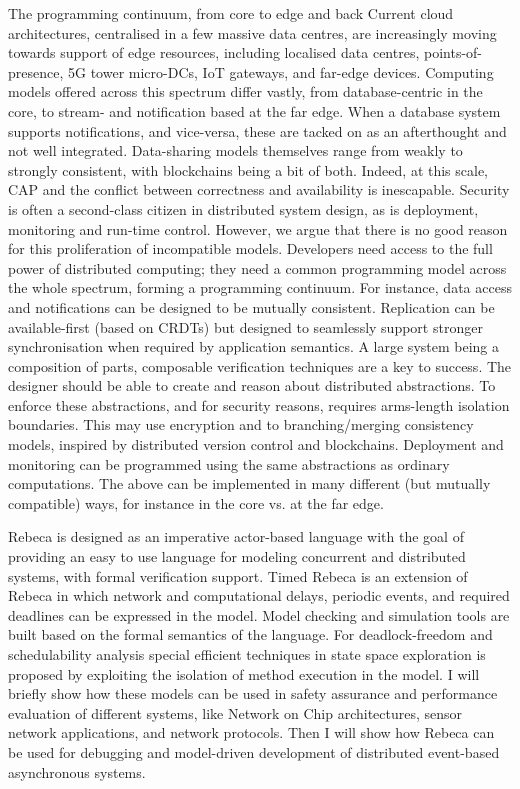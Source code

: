 \documentclass[a4paper,UKenglish]{dagrep-v2018}
\begin{document}
The programming continuum, from core to edge and back
Current cloud architectures, centralised in a few massive data centres, are increasingly moving towards support of edge resources, including localised data centres, points-of-presence, 5G tower micro-DCs, IoT gateways, and far-edge devices. Computing models offered across this spectrum differ vastly, from database-centric in the core, to stream- and notification based at the far edge. When a database system supports notifications, and vice-versa, these are tacked on as an afterthought and not well integrated. Data-sharing models themselves range from weakly to strongly consistent, with blockchains being a bit of both. Indeed, at this scale, CAP and the conflict between correctness and availability is inescapable. Security is often a second-class citizen in distributed system design, as is deployment, monitoring and run-time control. However, we argue that there is no good reason for this proliferation of incompatible models. Developers need access to the full power of distributed computing; they need a common programming model across the whole spectrum, forming a programming continuum. For instance, data access and notifications can be designed to be mutually consistent. Replication can be available-first (based on CRDTs) but designed to seamlessly support stronger synchronisation when required by application semantics. A large system being a composition of parts, composable verification techniques are a key to success. The designer should be able to create and reason about distributed abstractions. To enforce these abstractions, and for security reasons, requires arms-length isolation boundaries. This may use encryption and to branching/merging consistency models, inspired by distributed version control and blockchains. Deployment and monitoring can be programmed using the same abstractions as ordinary computations. The above can be implemented in many different (but mutually compatible) ways, for instance in the core vs. at the far edge.



\license

Rebeca is designed as an imperative actor-based language with the goal of providing an easy to use language for modeling concurrent and distributed systems, with formal verification support.
Timed Rebeca is an extension of Rebeca in which network and computational delays, periodic events, and required deadlines can be expressed in the model. Model checking and simulation tools are built based on the formal semantics of the language. For deadlock-freedom and schedulability analysis special efficient techniques in state space exploration is proposed by exploiting the isolation of method execution in the model. I will briefly show how these models can be used in safety assurance and performance evaluation of different systems, like Network on Chip architectures, sensor network applications, and network protocols. Then I will show how Rebeca can be used for debugging and model-driven development of distributed event-based asynchronous systems.
\end{document}
